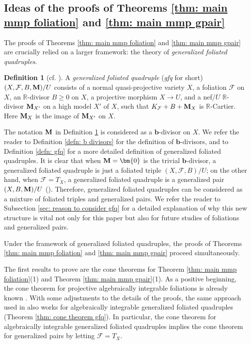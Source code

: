 \documentclass[11pt]{amsart}
\numberwithin{equation}{section}
\newcommand{\bb}{\bm{b}}
\newcommand{\Mm}{{\bf{M}}}
\newcommand{\Rr}{\mathbb{R}}
\newcommand{\Ff}{\mathcal{F}}
\theoremstyle{definition}
\newtheorem{defn}[thm]{Definition}
\theoremstyle{definition}
\theoremstyle{definition}
\begin{document}
\subsection{Ideas of the proofs of Theorems \ref{thm: main mmp foliation} and \ref{thm: main mmp gpair}} The proofs of Theorems \ref{thm: main mmp foliation} and \ref{thm: main mmp gpair} are crucially relied on a larger framework: the theory of \emph{generalized foliated quadruples}. 
\begin{defn}[{cf. \cite[Definition 1.2]{LLM23}}]\label{defn: gfq intro}
A \emph{generalized foliated quadruple} (\emph{gfq} for short) $(X,\Ff,B,\Mm)/U$ consists of a normal quasi-projective variety $X$, a foliation $\Ff$ on $X$, an $\mathbb R$-divisor $B\geq 0$ on $X$, a projective morphism $X\rightarrow U$, and a nef$/U$ $\Rr$-divisor $\Mm_{X'}$ on a high model $X'$ of $X$, such that $K_{\Ff}+B+\Mm_X$ is $\Rr$-Cartier. Here $\Mm_X$ is the image of $\Mm_{X'}$ on $X$.
\end{defn}
The notation $\Mm$ in Definition \ref{defn: gfq intro} is considered as a $\bb$-divisor on $X$. We refer the reader to Definition \ref{defn: b divisors} for the definition of $\bb$-divisors, and to Definition \ref{defn: gfq} for a more detailed definition of generalized foliated quadruples. It is clear that when $\Mm=\bm{0}$ is the trivial $\bb$-divisor, a generalized foliated quadruple is just a foliated triple $(X,\Ff,B)/U$; on the other hand, when $\Ff=T_X$, a generalized foliated quadruple is a generalized pair $(X,B,\Mm)/U$ (\cite[Definition 1.4]{BZ16}). Therefore, generalized foliated quadruples can be considered as a mixture of foliated triples and generalized pairs. We refer the reader to Subsection \ref{sec: reason to consider gfq} for a detailed explanation of why this new structure is vital not only for this paper but also for future studies of foliations and generalized pairs.

Under the framework of generalized foliated quadruples, the proofs of Theorems \ref{thm: main mmp foliation} and \ref{thm: main mmp gpair} proceed simultaneously.

\medskip

The first results to prove are the cone theorems for Theorem \ref{thm: main mmp foliation}(1) and Theorem \ref{thm: main mmp gpair}(1). As a positive beginning, the cone theorem for projective algebraically integrable foliations is already known \cite{ACSS21}. With some adjustments to the details of the proofs, the same approach used in \cite{ACSS21} also works for algebraically integrable generalized foliated quadruples (Theorem \ref{thm: cone theorem gfq}). In particular, the cone theorem for algebraically integrable generalized foliated quadruples implies the cone theorem for generalized pairs by letting $\Ff=T_X$.
\end{document}
